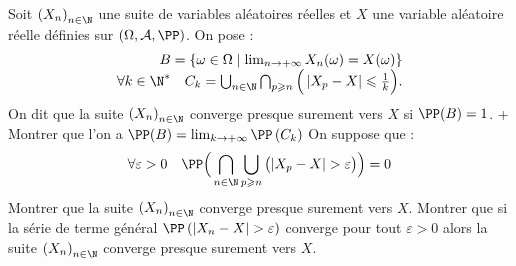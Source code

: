 \begin{exercise}[title=Convergence presque sure]
Soit $\left(X_{n}\right)_{n \in \N}$ une suite de variables aléatoires réelles et $X$ une variable aléatoire réelle définies sur $(\Omega, \mathcal{A}, \PP) $. On pose :
\begin{equation*}
\begin{array}{r}
B=\left\{\omega \in \Omega \mid \lim _{n \rightarrow+\infty} X_{n}(\omega)=X(\omega)\right\} \\
\forall k \in \N^{*} \quad C_{k}=\bigcup_{n \in \N} \bigcap_{p \geqslant n}\Big(\left|X_{p}-X\right| \leqslant \frac{1}{k}\Big) .
\end{array}
\end{equation*}
On dit que la suite $\left(X_{n}\right)_{n \in \N}$ converge presque surement vers $X$ si $\PP(B)=1$.
\question+ Montrer que l'on a $\PP(B)=\lim _{k \rightarrow+\infty} \PP\left(C_{k}\right)$
\question On suppose que :
\begin{equation*}
\forall \varepsilon>0 \quad \PP\Big(\bigcap_{n \in \N} \bigcup_{p \geqslant n}\big(|X_{p}-X|>\varepsilon\big)\Big)=0
\end{equation*}
Montrer que la suite $\left(X_{n}\right)_{n \in \N}$ converge presque surement vers $X$.
\question Montrer que si la série de terme général $\PP\left(\left|X_{n}-X\right|>\varepsilon\right)$ converge pour tout $\varepsilon>0$ alors la suite $\left(X_{n}\right)_{n \in \N}$ converge presque surement vers $X$.
\endquestions 
\end{exercise}


